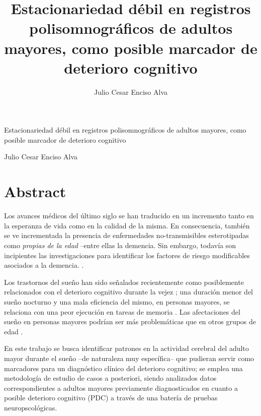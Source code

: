 \documentclass[12pt,a4paper]{mitthesis}
\begin{document}

\title{Estacionariedad d\'ebil en registros polisomnogr\'aficos de adultos mayores,
como posible marcador de deterioro cognitivo}
%
\author{Julio Cesar Enciso Alva}

\begin{center}
\huge{Estacionariedad d\'ebil en registros polisomnogr\'aficos de adultos mayores,
como posible marcador de deterioro cognitivo}


\Large{Julio Cesar Enciso Alva}
\end{center}

\newpage


\chapter*{Abstract}

Los avances m\'edicos del \'ultimo siglo se han traducido en un incremento tanto en la esperanza
de vida como en la calidad de la misma. En consecuencia, tambi\'en se ve incrementada la presencia
de enfermedades no-transmisibles esterotipadas como \textit{propias de la edad} --entre ellas la 
demencia.
Sin embargo, todav\'ia son incipientes las investigaciones para identificar los factores de riesgo 
modificables asociados a la demencia. \cite{PlanAlzheimer04}.

Los trastornos del sue\~no han sido se\~nalados recientemente como posiblemente relacionados con el 
deterioro cognitivo durante la vejez \cite{Amer13,Miyata13,Potvin12}; una duraci\'on menor del 
sue\~no nocturno y una mala eficiencia del mismo, en personas mayores, se relaciona con una peor 
ejecuci\'on en tareas de memoria \cite{Reid06}. 
Las afectaciones
del sue\~no en personas mayores podr\'ian ser m\'as problem\'aticas que en otros grupos de 
edad
\cite{Potvin12}.

En este trabajo se busca identificar patrones en la actividad cerebral del adulto mayor durante el 
sue\~no --de naturaleza muy espec\'ifica-- que pudieran servir como marcadores para un 
diagn\'ostico cl\'inico del deterioro cognitivo;
se emplea una metodolog\'ia de estudio de casos a posteriori, siendo analizados datos 
correspondientes a adultos mayores previamente diagnosticados en cuanto a 
posible deterioro cognitivo (PDC) a trav\'es de una bater\'ia de pruebas neuropscol\'ogicas.
\end{document}
